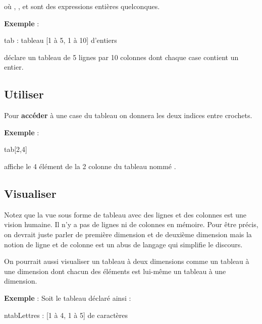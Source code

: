 	où , , 
	 et  sont des
	expressions entières quelconques.

	\textbf{Exemple} :
	
	\begin{Pseudocode}
		\Stmt tab : tableau [1 à 5, 1 à 10] d'entiers
	\end{Pseudocode}
	
	déclare un tableau de 5 lignes par 10 colonnes dont chaque case
	contient un entier.
	
\subsection{Utiliser}
	\marginicon{definition}
	Pour \textbf{accéder} à une case du tableau on donnera les deux indices
	entre crochets.
	
	\textbf{Exemple} :
	
	\begin{Pseudocode}
		\Stmt \Write tab[2,4]
	\end{Pseudocode}
	
	affiche le 4\ieme{} élément de la 2\ieme{} colonne
	du tableau nommé \pseudocode{tab}.


\subsection{Visualiser}

	Notez que la vue sous forme de tableau avec des lignes
	et des colonnes est une vision humaine.
	Il n'y a pas de lignes ni de colonnes en mémoire.
	Pour être précis,
	on devrait juste parler de première dimension et
	de deuxième dimension
	mais la notion de ligne et de colonne
	est un abus de langage qui simplifie le discours.
	
	On pourrait aussi visualiser un tableau à deux dimensions
	comme un tableau à une dimension dont chacun des éléments est
	lui-même un tableau à une dimension.

	\textbf{Exemple} : Soit le tableau déclaré ainsi :

	\begin{Pseudocode}
	\Decl ntabLettres : [1 à 4, 1 à 5] de caractères
	\end{Pseudocode}

